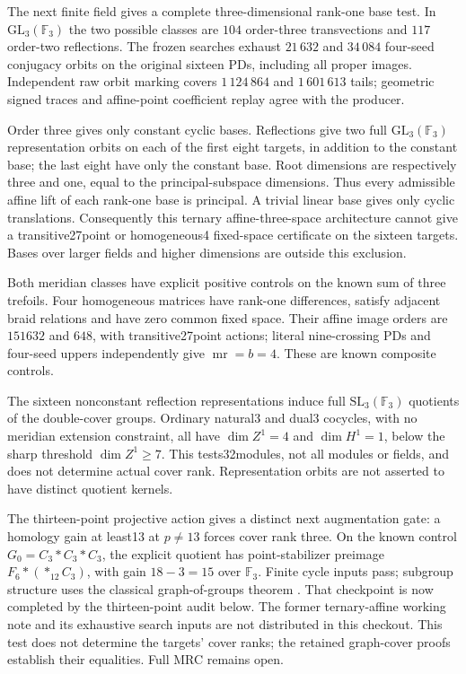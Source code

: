 \documentclass[11pt]{article}
\newcommand{\mr}{\operatorname{mr}}
\begin{document}
The next finite field gives a complete three-dimensional
rank-one base test. In $\mathrm{GL}_3(\mathbb F_3)$ the two
possible classes are $104$ order-three transvections and
$117$ order-two reflections. The frozen searches exhaust
$21\,632$ and $34\,084$ four-seed conjugacy orbits on the
original sixteen PDs, including all proper images.
Independent raw orbit marking covers $1\,124\,864$ and
$1\,601\,613$ tails; geometric signed traces and affine-point
coefficient replay agree with the producer.

Order three gives only constant cyclic bases. Reflections
give two full $\mathrm{GL}_3(\mathbb F_3)$ representation
orbits on each of the first eight targets, in addition to
the constant base; the last eight have only the constant
base. Root dimensions are respectively three and one, equal
to the principal-subspace dimensions. Thus every admissible
affine lift of each rank-one base is principal. A trivial
linear base gives only cyclic translations. Consequently
this ternary affine-three-space architecture cannot give a
transitive27point or homogeneous4 fixed-space certificate
on the sixteen targets. Bases over larger fields and higher
dimensions are outside this exclusion.

Both meridian classes have explicit positive controls on
the known sum of three trefoils. Four homogeneous matrices
have rank-one differences, satisfy adjacent braid relations
and have zero common fixed space. Their affine image orders
are $151632$ and $648$, with transitive27point actions;
literal nine-crossing PDs and four-seed uppers independently
give $\mr=b=4$. These are known composite controls.

The sixteen nonconstant reflection representations induce
full $\mathrm{SL}_3(\mathbb F_3)$ quotients of the double-cover
groups. Ordinary natural3 and dual3 cocycles, with no
meridian extension constraint, all have $\dim Z^1=4$ and
$\dim H^1=1$, below the sharp threshold $\dim Z^1\ge7$.
This tests32modules, not all modules or fields, and does not
determine actual cover rank. Representation orbits are not
asserted to have distinct quotient kernels.

The thirteen-point projective action gives a distinct next
augmentation gate: a homology gain at least13 at $p\ne13$
forces cover rank three. On the known control
$G_0=C_3*C_3*C_3$, the explicit quotient has point-stabilizer
preimage $F_6*(*_{12}C_3)$, with gain $18-3=15$ over
$\mathbb F_3$. Finite cycle inputs pass; subgroup structure
uses the classical graph-of-groups theorem \cite{serre}.
That checkpoint is now completed by the thirteen-point audit
below. The former ternary-affine working note and its exhaustive search
inputs are not distributed in this checkout. This test does not determine
the targets' cover ranks; the retained graph-cover proofs establish their
equalities. Full MRC remains open.
\end{document}
